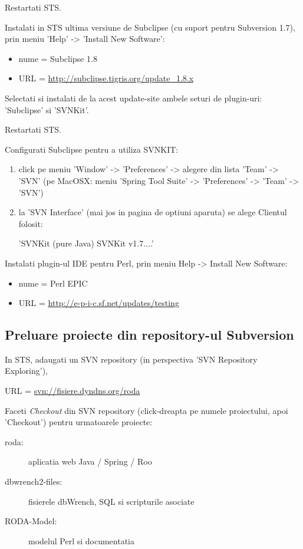 Restartati STS.

Instalati in STS ultima versiune de Subclipse (cu suport pentru Subversion 1.7),
prin meniu 'Help' -> 'Install New Software':
\begin{itemize}
\item 
nume = Subclipse 1.8
\item
URL = \url{http://subclipse.tigris.org/update_1.8.x}
\end{itemize}

Selectati si instalati de la acest update-site ambele seturi de plugin-uri:
'Subclipse' si 'SVNKit'.

Restartati STS.

Configurati Subclipse pentru a utiliza SVNKIT:
\begin{enumerate}
\item 
click pe meniu 'Window' -> 'Preferences' -> alegere din lista 'Team' -> 'SVN'
(pe MacOSX: meniu 'Spring Tool Suite' -> 'Preferences' -> 'Team' -> 'SVN')
\item
la 'SVN Interface' (mai jos in pagina de optiuni aparuta) se alege Clientul
folosit:

'SVNKit (pure Java) SVNKit v1.7....'
\end{enumerate}

Instalati plugin-ul IDE pentru Perl, prin meniu Help -> Install
New Software:
\begin{itemize}
\item 
nume = Perl EPIC
\item
URL = \url{http://e-p-i-c.sf.net/updates/testing}
\end{itemize}

\subsection{Preluare proiecte din repository-ul Subversion}
In STS, adaugati un SVN repository (in perspectiva 'SVN Repository
Exploring'), 

URL = \url{svn://fisiere.dyndns.org/roda}

Faceti \emph{Checkout} din SVN repository (click-dreapta pe numele
proiectului, apoi 'Checkout') pentru urmatoarele proiecte:
\begin{description}
\item [roda:] aplicatia web Java / Spring / Roo
\item [dbwrench2-files:] fisierele dbWrench, SQL si scripturile asociate
\item [RODA-Model:] modelul Perl si documentatia
\end{description}

